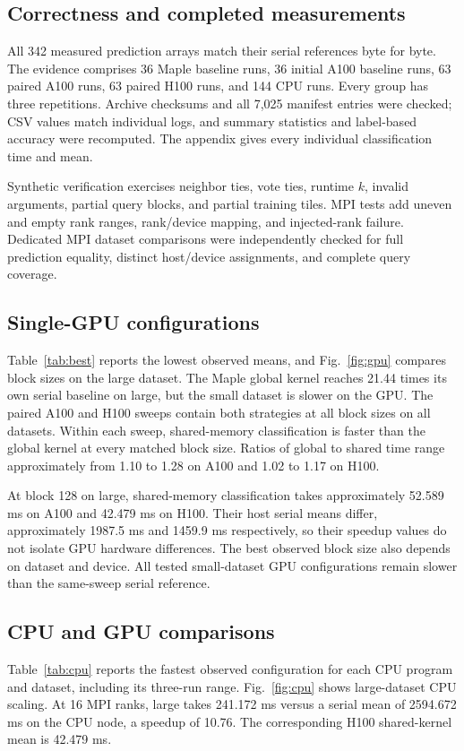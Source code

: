 \documentclass[conference]{IEEEtran}
\begin{document}
\subsection{Correctness and completed measurements}
All 342 measured prediction arrays match their serial references byte for byte. The evidence comprises 36 Maple baseline runs, 36 initial A100 baseline runs, 63 paired A100 runs, 63 paired H100 runs, and 144 CPU runs. Every group has three repetitions. Archive checksums and all 7,025 manifest entries were checked; CSV values match individual logs, and summary statistics and label-based accuracy were recomputed. The appendix gives every individual classification time and mean.

Synthetic verification exercises neighbor ties, vote ties, runtime $k$, invalid arguments, partial query blocks, and partial training tiles. MPI tests add uneven and empty rank ranges, rank/device mapping, and injected-rank failure. Dedicated MPI dataset comparisons were independently checked for full prediction equality, distinct host/device assignments, and complete query coverage.



\subsection{Single-GPU configurations}
Table~\ref{tab:best} reports the lowest observed means, and Fig.~\ref{fig:gpu} compares block sizes on the large dataset. The Maple global kernel reaches 21.44 times its own serial baseline on large, but the small dataset is slower on the GPU. The paired A100 and H100 sweeps contain both strategies at all block sizes on all datasets. Within each sweep, shared-memory classification is faster than the global kernel at every matched block size. Ratios of global to shared time range approximately from 1.10 to 1.28 on A100 and 1.02 to 1.17 on H100.

At block 128 on large, shared-memory classification takes approximately 52.589 ms on A100 and 42.479 ms on H100. Their host serial means differ, approximately 1987.5 ms and 1459.9 ms respectively, so their speedup values do not isolate GPU hardware differences. The best observed block size also depends on dataset and device. All tested small-dataset GPU configurations remain slower than the same-sweep serial reference.




\subsection{CPU and GPU comparisons}
Table~\ref{tab:cpu} reports the fastest observed configuration for each CPU program and dataset, including its three-run range. Fig.~\ref{fig:cpu} shows large-dataset CPU scaling. At 16 MPI ranks, large takes 241.172 ms versus a serial mean of 2594.672 ms on the CPU node, a speedup of 10.76. The corresponding H100 shared-kernel mean is 42.479 ms.
\end{document}

